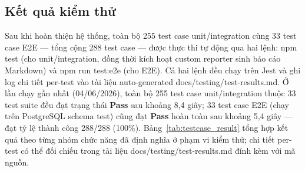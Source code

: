 \subsection{Kết quả kiểm thử}

Sau khi hoàn thiện hệ thống, toàn bộ 255 test case unit/integration cùng 33 test case E2E --- tổng cộng 288 test case --- được thực thi tự động qua hai lệnh: npm test (cho unit/integration, đồng thời kích hoạt custom reporter sinh báo cáo Markdown) và npm run test:e2e (cho E2E). Cả hai lệnh đều chạy trên Jest và ghi log chi tiết per-test vào tài liệu auto-generated docs/testing/test-results.md. Ở lần chạy gần nhất (04/06/2026), toàn bộ 255 test case unit/integration thuộc 33 test suite đều đạt trạng thái \textbf{Pass} sau khoảng 8,4 giây; 33 test case E2E (chạy trên PostgreSQL schema test) cũng đạt \textbf{Pass} hoàn toàn sau khoảng 5,4 giây --- đạt tỷ lệ thành công 288/288 (100\%). Bảng~\ref{tab:testcase_result} tổng hợp kết quả theo từng nhóm chức năng đã định nghĩa ở phạm vi kiểm thử; chi tiết per-test có thể đối chiếu trong tài liệu docs/testing/test-results.md đính kèm với mã nguồn.

